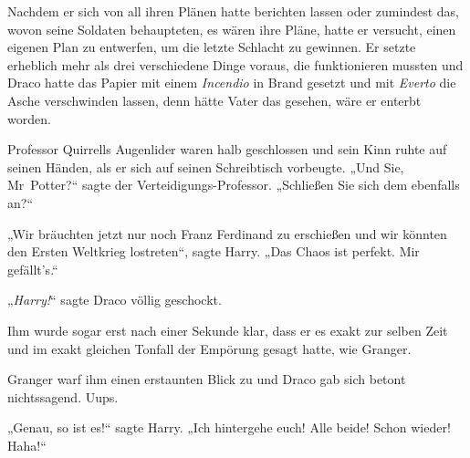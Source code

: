 Nachdem er sich von all ihren Plänen hatte berichten lassen oder zumindest das, wovon seine Soldaten behaupteten, es wären ihre Pläne, hatte er versucht, einen eigenen Plan zu entwerfen, um die letzte Schlacht zu gewinnen. Er setzte erheblich mehr als drei verschiedene Dinge voraus, die funktionieren mussten und Draco hatte das Papier mit einem \emph{Incendio} in Brand gesetzt und mit \emph{Everto} die Asche verschwinden lassen, denn hätte Vater das gesehen, wäre er enterbt worden.

Professor Quirrells Augenlider waren halb geschlossen und sein Kinn ruhte auf seinen Händen, als er sich auf seinen Schreibtisch vorbeugte. „Und Sie, Mr~Potter?“ sagte der Verteidigungs-Professor. „Schließen Sie sich dem ebenfalls an?“

„Wir bräuchten jetzt nur noch Franz Ferdinand zu erschießen und wir könnten den Ersten Weltkrieg lostreten“, sagte Harry. „Das Chaos ist perfekt. Mir gefällt’s.“

„\emph{Harry!}“ sagte Draco völlig geschockt.

Ihm wurde sogar erst nach einer Sekunde klar, dass er es exakt zur selben Zeit und im exakt gleichen Tonfall der Empörung gesagt hatte, wie Granger.

Granger warf ihm einen erstaunten Blick zu und Draco gab sich betont nichtssagend. Uups.

„Genau, so ist es!“ sagte Harry. „Ich hintergehe euch! Alle beide! Schon wieder! Haha!“

